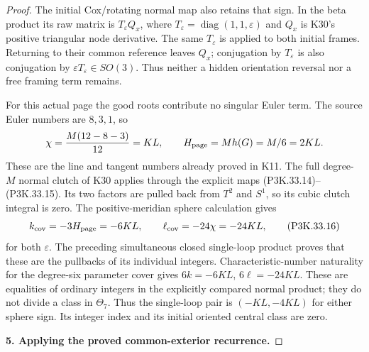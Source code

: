 \begin{proof}
The initial Cox/rotating normal map also retains that sign.
In the beta product its raw matrix is
\(T_\varepsilon Q_x\), where
\(T_\varepsilon=\operatorname{diag}(1,1,\varepsilon)\) and
\(Q_x\) is K30's positive triangular node derivative. The same
\(T_\varepsilon\) is applied to both initial frames. Returning
to their common reference leaves \(Q_x\); conjugation by
\(T_\varepsilon\) is also conjugation by
\(\varepsilon T_\varepsilon\in SO(3)\). Thus neither a hidden
orientation reversal nor a free framing term remains.

For this actual page the good roots contribute no singular Euler
term. The source Euler numbers are \(8,3,1\), so
\[
       \chi=\frac{M(12-8-3)}{12}=KL,
       \qquad H_{\rm page}=M h(G)=M/6=2KL.
\]
These are the line and tangent numbers already proved in K11.
The full degree-\(M\) normal clutch of K30 applies through
the explicit maps (P3K.33.14)--(P3K.33.15). Its two factors are pulled
back from \(T^2\) and \(S^1\), so its cubic clutch integral
is zero. The positive-meridian sphere calculation gives
\[
              k_{\rm cov}=-3H_{\rm page}=-6KL,
              \qquad \ell_{\rm cov}=-24\chi=-24KL,
                                                               \tag{P3K.33.16}
\]
for both \(\varepsilon\). The preceding simultaneous closed
single-loop product proves that these are the pullbacks of its
individual integers. Characteristic-number naturality for the
degree-six parameter cover gives
\(6k=-6KL\), \(6\ell=-24KL\). These are equalities of
ordinary integers in the explicitly compared normal product;
they do not divide a class in \(\Theta_7\). Thus the single-loop
pair is \((-KL,-4KL)\) for either sphere sign. Its integer
index and its initial oriented central class are zero.

\par\medskip\noindent\textbf{5. Applying the proved common-exterior recurrence.}\enspace


\end{proof}
